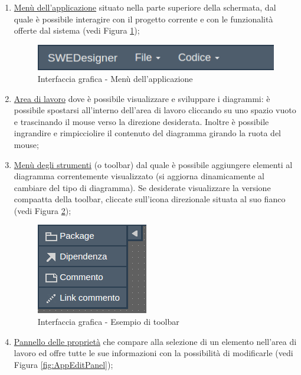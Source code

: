 \documentclass[../ManualeUtente.tex]{subfiles}
\begin{document}
			\begin{enumerate}
				\item \underline{Menù dell'applicazione} situato nella parte superiore della schermata, dal quale è
				possibile interagire con il progetto corrente e con
				le funzionalità offerte dal sistema (vedi Figura \ref{fig:AppMenu});
				\begin{figure} [h!]
					\centering
					\includegraphics[scale=0.6]{./Immagini/AppMenu.png}
					\caption{Interfaccia grafica - Menù dell'applicazione}\label{fig:AppMenu}
				\end{figure}
				\item \underline{Area di lavoro} dove è possibile visualizzare e sviluppare i diagrammi: è possibile
				spostarsi all'interno dell'area di lavoro cliccando su uno spazio vuoto e trascinando il mouse
				verso la direzione desiderata. Inoltre è possibile ingrandire e rimpicciolire il contenuto
				del diagramma girando la ruota del mouse;
				\item \underline{Menù degli strumenti} (o toolbar) dal quale è possibile aggiungere elementi al diagramma
				correntemente visualizzato (si aggiorna dinamicamente al cambiare del tipo di diagramma). Se desiderate
				visualizzare la versione compaatta della toolbar, cliccate sull'icona direzionale situata al suo fianco
				(vedi Figura \ref{fig:AppToolbar});
				\begin{figure} [h!]
					\centering
					\includegraphics[scale=0.6]{./Immagini/AppToolbar.png}
					\caption{Interfaccia grafica - Esempio di toolbar}\label{fig:AppToolbar}
				\end{figure}
				\item \underline{Pannello delle proprietà} che compare alla selezione di un elemento nell'area di lavoro
				ed offre tutte le sue informazioni con la possibilità di modificarle (vedi Figura \ref{fig:AppEditPanel});
				\begin{figure} [h!]
					\centering

\end{figure}
\end{enumerate}
\end{document}
